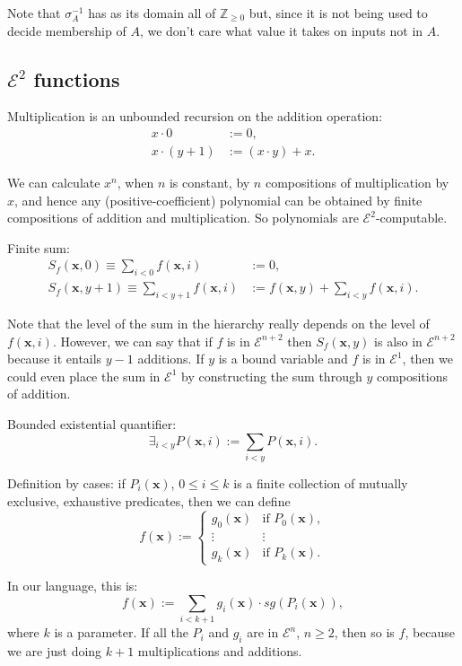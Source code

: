 \documentclass[a4paper]{article}
\newcommand{\grz}[1]{$\mathcal{E}^{#1}$}	%
\newcommand{\ZZ}{\mathbb{Z}}
\newcommand{\xvec}{\mathbf{x}}	%
\newcommand{\recur}[1]{\begin{equation} \begin{split} #1 \end{split} \end{equation}}	%
\theoremstyle{plain}
\theoremstyle{definition}
\begin{document}
Note that $\sigma_A^{-1}$ has as its domain all of $\ZZ_{\geq 0}$ but, since it is not being used to decide membership of $A$, we don't care what value it takes on inputs not in $A$.

\subsection{\grz{2} functions}
Multiplication is an unbounded recursion on the addition operation:
\recur{
	x \cdot 0 &:= 0,				\\
	x \cdot (y+1) &:= (x \cdot y) + x.
}

We can calculate $x^n$, when $n$ is constant, by $n$ compositions of multiplication by $x$, and hence any (positive-coefficient) polynomial can be obtained by finite compositions of addition and multiplication. So polynomials are \grz{2}-computable.

Finite sum:
\recur{
	S_f(\xvec,0) \equiv \sum_{i < 0} f(\xvec, i) &:= 0,		\\
	S_f(\xvec,y+1) \equiv \sum_{i < y+1} f(\xvec,i) &:= f(\xvec,y) + \sum_{i < y} f(\xvec,i).
}

Note that the level of the sum in the hierarchy really depends on the level of $f(\xvec,i)$. However, we can say that if $f$ is in \grz{n+2} then $S_f(\xvec,y)$ is also in \grz{n+2} because it entails $y-1$ additions. If $y$ is a bound variable and $f$ is in \grz{1}, then we could even place the sum in \grz{1} by constructing the sum through $y$ compositions of addition.

Bounded existential quantifier:
\begin{equation} \exists_{i < y} P(\xvec,i) := \sum_{i < y} P(\xvec,i). \end{equation}


Definition by cases: if  $P_i(\xvec)$, $0 \leq i \leq k$ is a finite collection of mutually exclusive, exhaustive predicates, then we can define
\[ f(\xvec) := \begin{cases}
	g_0(\xvec) & \textrm{if }P_0(\xvec),	\\
	\vdots & \vdots	\\
	g_k(\xvec) & \textrm{if } P_k(\xvec).
\end{cases} \]

In our language, this is:
\begin{equation} f(\xvec) := \sum_{i < k+1} g_i(\xvec) \cdot sg(P_i(\xvec)), \end{equation}
where $k$ is a parameter. If all the $P_i$ and $g_i$ are in \grz{n}, $n \geq 2$, then so is $f$, because we are just doing $k+1$ multiplications and additions.  
\end{document}
